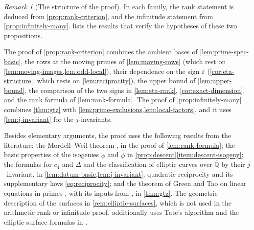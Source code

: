 \documentclass[12pt,oneside,openany]{book}
\theoremstyle{definition}
\theoremstyle{plain}
\numberwithin{equation}{chapter}
\theoremstyle{plain}
\theoremstyle{definition}
\theoremstyle{remark}
\newtheorem{remark}[remark]{Remark}
\newcommand{\Qbar}{\overline{\mathbb Q}}
\newcommand{\dual}{\hat\phi}
\newcommand{\eps}{\varepsilon}
\begin{document}
\begin{remark}[The structure of the proof]\label{rem:proof-structure}
In each family, the rank statement is deduced from \cref{prop:rank-criterion}, and the infinitude statement from \cref{prop:infinitely-many}.  lists the results that verify the hypotheses of these two propositions.

The proof of \cref{prop:rank-criterion} combines the ambient bases of \cref{lem:prime-spec-basic}, the rows at the moving primes of \cref{lem:moving-rows} (which rest on \cref{lem:moving-images,lem:odd-local}), their dependence on the sign $\eps$ (\cref{cor:eta-structure}, which rests on \cref{lem:reciprocity}), the upper bound of \cref{lem:upper-bound}, the comparison of the two signs in \cref{lem:eta-rank}, \cref{cor:exact-dimension}, and the rank formula of \cref{lem:rank-formula}. The proof of \cref{prop:infinitely-many} combines \cref{thm:gtz} with \cref{lem:prime-exclusions,lem:local-factors}, and it uses \cref{lem:j-invariant} for the $j$-invariants.

Besides elementary arguments, the proof uses the following results from the literature: the Mordell--Weil theorem \cite[Theorem~VIII.6.7]{SilvermanAEC}, in the proof of \cref{lem:rank-formula}; the basic properties of the isogenies $\phi$ and $\dual$ in \cref{prop:descent}\ref{item:descent-isogeny}; the formulas for $c_4$ and $\Delta$ and the classification of elliptic curves over $\Qbar$ by their $j$-invariant, in \cref{lem:datum-basic,lem:j-invariant}; quadratic reciprocity and its supplementary laws \eqref{eq:reciprocity}; and the theorem of Green and Tao on linear equations in primes \cite{GT2010}, with its inputs from \cite{GT2012,GTZ2012}, in \cref{thm:gtz}.
The geometric description of the surfaces in \cref{rem:elliptic-surfaces}, which is not used in the arithmetic rank or infinitude proof, additionally uses Tate's algorithm \cite{Tate1975} and the elliptic-surface formulas in \cite{SchuttShioda2010}.
\end{remark}
\end{document}
